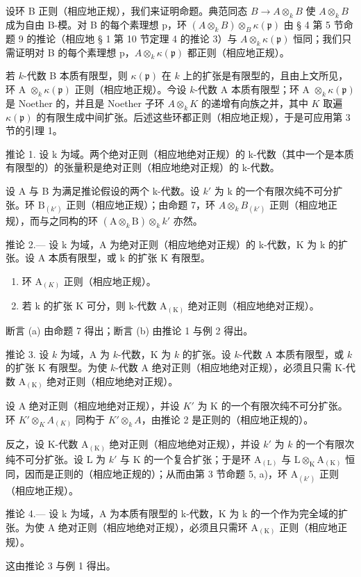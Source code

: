 设环 B 正则（相应地正规），我们来证明命题。典范同态 \(B \to A \otimes_{k} B\) 使 \(A \otimes_{k} B\) 成为自由 B-模。对 B 的每个素理想 p，环 \((A \otimes_{k} B) \otimes_{B} \kappa(\mathfrak{p})\) 由 § 4 第 5 节命题 9 的推论（相应地 § 1 第 10 节定理 4 的推论 3）与 \(A \otimes_{k} \kappa(\mathfrak{p})\) 恒同；我们只需证明对 B 的每个素理想 p，\(A \otimes_{k} \kappa(\mathfrak{p})\) 都正则（相应地正规）。

若 \(k\)-代数 B 本质有限型，则 \(\kappa(\mathfrak{p})\) 在 \(k\) 上的扩张是有限型的，且由上文所见，环 A \(\otimes_k \kappa(\mathfrak{p})\) 正则（相应地正规）。今设 \(k\)-代数 A 本质有限型；环 A \(\otimes_k \kappa(\mathfrak{p})\) 是 Noether 的，并且是 Noether 子环 \(A \otimes_k K\) 的递增有向族之并，其中 \(K\) 取遍 \(\kappa(\mathfrak{p})\) 的有限生成中间扩张。后述这些环都正则（相应地正规），于是可应用第 3 节的引理 1。

推论 1. 设 k 为域。两个绝对正则（相应地绝对正规）的 k-代数（其中一个是本质有限型的）的张量积是绝对正则（相应地绝对正规）的 k-代数。

设 A 与 B 为满足推论假设的两个 k-代数。设 \(k'\) 为 k 的一个有限次纯不可分扩张。环 \(\mathrm{B}_{(k')}\) 正则（相应地正规）；由命题 7，环 \(A \otimes_{k} B_{(k')}\) 正则（相应地正规），而与之同构的环 \((\mathrm{A} \otimes_{k} \mathrm{B}) \otimes_{k} k'\) 亦然。

推论 2.--- 设 k 为域，A 为绝对正则（相应地绝对正规）的 k-代数，K 为 k 的扩张。设 A 本质有限型，或 k 的扩张 K 有限型。

\begin{enumerate}
\def\labelenumi{\alph{enumi})}
\item
  环 \(\mathrm{A}_{(K)}\) 正则（相应地正规）。
\item
  若 k 的扩张 K 可分，则 k-代数 \(\mathrm{A}_{(\mathrm{K})}\) 绝对正则（相应地绝对正规）。
\end{enumerate}

断言 (a) 由命题 7 得出；断言 (b) 由推论 1 与例 2 得出。

推论 3. 设 \(k\) 为域，A 为 \(k\)-代数，K 为 \(k\) 的扩张。设 \(k\)-代数 A 本质有限型，或 \(k\) 的扩张 K 有限型。为使 \(k\)-代数 A 绝对正则（相应地绝对正规），必须且只需 K-代数 \(\mathrm{A}_{(\mathrm{K})}\) 绝对正则（相应地绝对正规）。

设 A 绝对正则（相应地绝对正规），并设 \(K'\) 为 K 的一个有限次纯不可分扩张。环 \(K'\otimes_{K}A_{(K)}\) 同构于 \(K'\otimes_{k}A\)，由推论 2 是正则的（相应地正规的）。

反之，设 K-代数 \(\mathrm{A}_{(\mathrm{K})}\) 绝对正则（相应地绝对正规），并设 \(k'\) 为 \(k\) 的一个有限次纯不可分扩张。设 L 为 \(k'\) 与 K 的一个复合扩张；于是环 \(\mathrm{A}_{(\mathrm{L})}\) 与 \(\mathrm{L} \otimes_{\mathrm{K}} \mathrm{A}_{(\mathrm{K})}\) 恒同，因而是正则的（相应地正规的）；从而由第 3 节命题 5, a)，环 \(\mathrm{A}_{(k')}\) 正则（相应地正规）。

推论 4.--- 设 k 为域，A 为本质有限型的 k-代数，K 为 k 的一个作为完全域的扩张。为使 A 绝对正则（相应地绝对正规），必须且只需环 \(\mathrm{A}_{(\mathrm{K})}\) 正则（相应地正规）。

这由推论 3 与例 1 得出。

